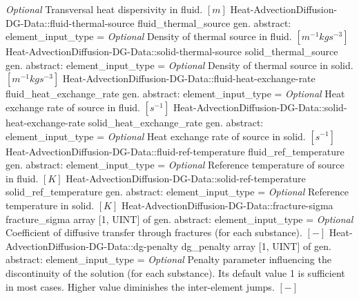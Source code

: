 \begin{RecordType}
			{ \it{Optional}}
			{{{Transversal heat dispersivity in fluid. }{$[m]$}%
}}
		\RecKey
			{Heat-AdvectionDiffusion-DG-Data::fluid-thermal-source}
			{fluid{\_}thermal{\_}source}
			{{gen. abstract: }}{{element{\_}input{\_}type}{ = }}
			{ \it{Optional}}
			{{{Density of thermal source in fluid. }{$[m^{-1}kgs^{-3}]$}%
}}
		\RecKey
			{Heat-AdvectionDiffusion-DG-Data::solid-thermal-source}
			{solid{\_}thermal{\_}source}
			{{gen. abstract: }}{{element{\_}input{\_}type}{ = }}
			{ \it{Optional}}
			{{{Density of thermal source in solid. }{$[m^{-1}kgs^{-3}]$}%
}}
		\RecKey
			{Heat-AdvectionDiffusion-DG-Data::fluid-heat-exchange-rate}
			{fluid{\_}heat{\_}exchange{\_}rate}
			{{gen. abstract: }}{{element{\_}input{\_}type}{ = }}
			{ \it{Optional}}
			{{{Heat exchange rate of source in fluid. }{$[s^{-1}]$}%
}}
		\RecKey
			{Heat-AdvectionDiffusion-DG-Data::solid-heat-exchange-rate}
			{solid{\_}heat{\_}exchange{\_}rate}
			{{gen. abstract: }}{{element{\_}input{\_}type}{ = }}
			{ \it{Optional}}
			{{{Heat exchange rate of source in solid. }{$[s^{-1}]$}%
}}
		\RecKey
			{Heat-AdvectionDiffusion-DG-Data::fluid-ref-temperature}
			{fluid{\_}ref{\_}temperature}
			{{gen. abstract: }}{{element{\_}input{\_}type}{ = }}
			{ \it{Optional}}
			{{{Reference temperature of source in fluid. }{$[K]$}%
}}
		\RecKey
			{Heat-AdvectionDiffusion-DG-Data::solid-ref-temperature}
			{solid{\_}ref{\_}temperature}
			{{gen. abstract: }}{{element{\_}input{\_}type}{ = }}
			{ \it{Optional}}
			{{{Reference temperature in solid. }{$[K]$}%
}}
		\RecKey
			{Heat-AdvectionDiffusion-DG-Data::fracture-sigma}
			{fracture{\_}sigma}
			{{array [1, UINT] of }{gen. abstract: }}{{element{\_}input{\_}type}{ = }}
			{ \it{Optional}}
			{{{Coefficient of diffusive transfer through fractures (for each substance). }{$[-]$}%
}}
		\RecKey
			{Heat-AdvectionDiffusion-DG-Data::dg-penalty}
			{dg{\_}penalty}
			{{array [1, UINT] of }{gen. abstract: }}{{element{\_}input{\_}type}{ = }}
			{ \it{Optional}}
			{{{Penalty parameter influencing the discontinuity of the solution (for each substance). Its default value 1 is sufficient in most cases.
Higher value diminishes the inter-element jumps. }{$[-]$}%
}}
\end{RecordType}
